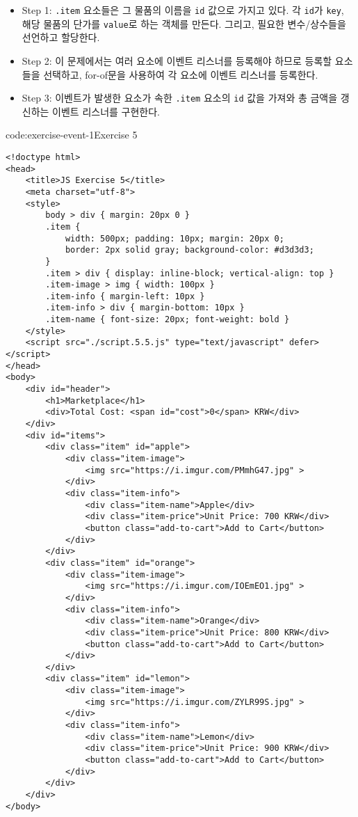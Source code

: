 \begin{itemize}
    \item Step 1: \texttt{.item} 요소들은 그 물품의 이름을 \texttt{id} 값으로 가지고 있다. 각 \texttt{id}가 \texttt{key}, 해당 물품의 단가를 \texttt{value}로 하는 객체를 만든다. 그리고, 필요한 변수/상수들을 선언하고 할당한다.
    \item Step 2: 이 문제에서는 여러 요소에 이벤트 리스너를 등록해야 하므로 등록할 요소들을 선택하고, for-of문을 사용하여 각 요소에 이벤트 리스너를 등록한다.
    \item Step 3: 이벤트가 발생한 요소가 속한 \texttt{.item} 요소의 \texttt{id} 값을 가져와 총 금액을 갱신하는 이벤트 리스너를 구현한다.
\end{itemize}
\newpage

\begin{codeenv}{code:exercise-event-1}{Exercise 5}\begin{verbatim}
<!doctype html>
<head>
    <title>JS Exercise 5</title>
    <meta charset="utf-8">
    <style>
        body > div { margin: 20px 0 }
        .item {
            width: 500px; padding: 10px; margin: 20px 0;
            border: 2px solid gray; background-color: #d3d3d3;
        }
        .item > div { display: inline-block; vertical-align: top }
        .item-image > img { width: 100px }
        .item-info { margin-left: 10px }
        .item-info > div { margin-bottom: 10px }
        .item-name { font-size: 20px; font-weight: bold }
    </style>
    <script src="./script.5.5.js" type="text/javascript" defer></script>
</head>
<body>
    <div id="header">
        <h1>Marketplace</h1>
        <div>Total Cost: <span id="cost">0</span> KRW</div>
    </div>
    <div id="items">
        <div class="item" id="apple">
            <div class="item-image">
                <img src="https://i.imgur.com/PMmhG47.jpg" >
            </div>
            <div class="item-info">
                <div class="item-name">Apple</div>
                <div class="item-price">Unit Price: 700 KRW</div>
                <button class="add-to-cart">Add to Cart</button>
            </div>
        </div>
        <div class="item" id="orange">
            <div class="item-image">
                <img src="https://i.imgur.com/IOEmEO1.jpg" >
            </div>
            <div class="item-info">
                <div class="item-name">Orange</div>
                <div class="item-price">Unit Price: 800 KRW</div>
                <button class="add-to-cart">Add to Cart</button>
            </div>
        </div>
        <div class="item" id="lemon">
            <div class="item-image">
                <img src="https://i.imgur.com/ZYLR99S.jpg" >
            </div>
            <div class="item-info">
                <div class="item-name">Lemon</div>
                <div class="item-price">Unit Price: 900 KRW</div>
                <button class="add-to-cart">Add to Cart</button>
            </div>
        </div>
    </div>
</body>
\end{verbatim}
\end{codeenv}

